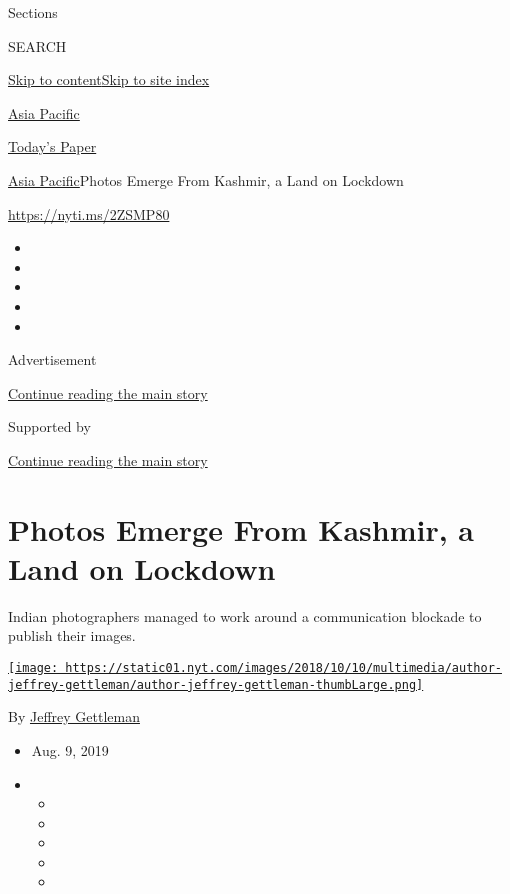 Sections

SEARCH

\protect\hyperlink{site-content}{Skip to
content}\protect\hyperlink{site-index}{Skip to site index}

\href{https://www.nytimes.com/section/world/asia}{Asia Pacific}

\href{https://myaccount.nytimes.com/auth/login?response_type=cookie\&client_id=vi}{}

\href{https://www.nytimes.com/section/todayspaper}{Today's Paper}

\href{/section/world/asia}{Asia Pacific}\textbar{}Photos Emerge From
Kashmir, a Land on Lockdown

\url{https://nyti.ms/2ZSMP80}

\begin{itemize}
\item
\item
\item
\item
\item
\end{itemize}

Advertisement

\protect\hyperlink{after-top}{Continue reading the main story}

Supported by

\protect\hyperlink{after-sponsor}{Continue reading the main story}

\hypertarget{photos-emerge-from-kashmir-a-land-on-lockdown}{%
\section{Photos Emerge From Kashmir, a Land on
Lockdown}\label{photos-emerge-from-kashmir-a-land-on-lockdown}}

Indian photographers managed to work around a communication blockade to
publish their images.

\href{https://www.nytimes.com/by/jeffrey-gettleman}{\texttt{[image: https://static01.nyt.com/images/2018/10/10/multimedia/author-jeffrey-gettleman/author-jeffrey-gettleman-thumbLarge.png]}}

By \href{https://www.nytimes.com/by/jeffrey-gettleman}{Jeffrey
Gettleman}

\begin{itemize}
\item
  Aug. 9, 2019
\item
  \begin{itemize}
  \item
  \item
  \item
  \item
  \item
  \end{itemize}
\end{itemize}

